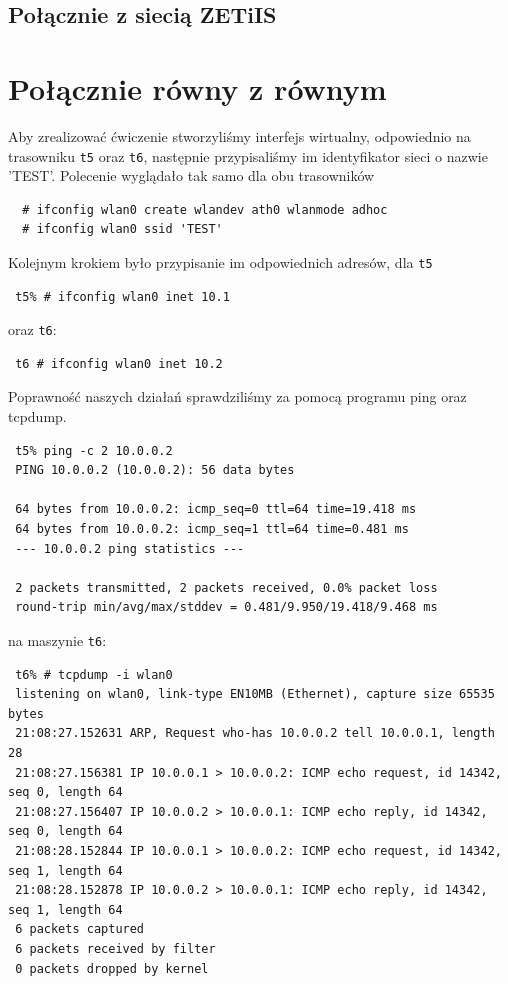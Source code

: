 \documentclass[a4paper,11pt,notitlepage]{article}
\begin{document}
\subsection{Połącznie z siecią ZETiIS}


\section{Połącznie równy z równym}
Aby zrealizować ćwiczenie stworzyliśmy interfejs wirtualny, odpowiednio na trasowniku \verb+t5+ oraz \verb+t6+, następnie przypisaliśmy im identyfikator sieci o nazwie 'TEST'. Polecenie wyglądało tak samo dla obu trasowników
\begin{verbatim}
  # ifconfig wlan0 create wlandev ath0 wlanmode adhoc
  # ifconfig wlan0 ssid 'TEST'
\end{verbatim}
Kolejnym krokiem było przypisanie im odpowiednich adresów, dla \verb+t5 +  
\begin{verbatim}
 t5% # ifconfig wlan0 inet 10.1
\end{verbatim}
oraz \verb+t6+:
\begin{verbatim}
 t6 # ifconfig wlan0 inet 10.2
\end{verbatim}
Poprawność naszych działań sprawdziliśmy za pomocą programu ping oraz tcpdump.
\begin{verbatim}
 t5% ping -c 2 10.0.0.2
 PING 10.0.0.2 (10.0.0.2): 56 data bytes

 64 bytes from 10.0.0.2: icmp_seq=0 ttl=64 time=19.418 ms
 64 bytes from 10.0.0.2: icmp_seq=1 ttl=64 time=0.481 ms
 --- 10.0.0.2 ping statistics ---

 2 packets transmitted, 2 packets received, 0.0% packet loss
 round-trip min/avg/max/stddev = 0.481/9.950/19.418/9.468 ms
\end{verbatim}
na maszynie \verb+t6+:
\begin{verbatim}
 t6% # tcpdump -i wlan0
 listening on wlan0, link-type EN10MB (Ethernet), capture size 65535 bytes
 21:08:27.152631 ARP, Request who-has 10.0.0.2 tell 10.0.0.1, length 28
 21:08:27.156381 IP 10.0.0.1 > 10.0.0.2: ICMP echo request, id 14342, seq 0, length 64
 21:08:27.156407 IP 10.0.0.2 > 10.0.0.1: ICMP echo reply, id 14342, seq 0, length 64
 21:08:28.152844 IP 10.0.0.1 > 10.0.0.2: ICMP echo request, id 14342, seq 1, length 64
 21:08:28.152878 IP 10.0.0.2 > 10.0.0.1: ICMP echo reply, id 14342, seq 1, length 64
 6 packets captured
 6 packets received by filter
 0 packets dropped by kernel
\end{verbatim}
\end{document}
